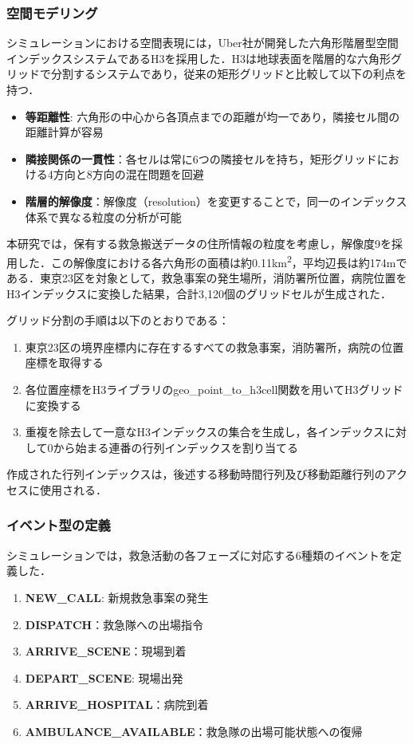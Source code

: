 \subsubsection{空間モデリング}
\label{空間モデリング}
シミュレーションにおける空間表現には，Uber社が開発した六角形階層型空間インデックスシステムであるH3\cite{H3}を採用した．H3は地球表面を階層的な六角形グリッドで分割するシステムであり，従来の矩形グリッドと比較して以下の利点を持つ．
\begin{itemize}
\item \textbf{等距離性}: 六角形の中心から各頂点までの距離が均一であり，隣接セル間の距離計算が容易
\item \textbf{隣接関係の一貫性}：各セルは常に6つの隣接セルを持ち，矩形グリッドにおける4方向と8方向の混在問題を回避
\item \textbf{階層的解像度}：解像度（resolution）を変更することで，同一のインデックス体系で異なる粒度の分析が可能
\end{itemize}
本研究では，保有する救急搬送データの住所情報の粒度を考慮し，解像度9を採用した．この解像度における各六角形の面積は約0.11\si{km^2}，平均辺長は約174mである．東京23区を対象として，救急事案の発生場所，消防署所位置，病院位置をH3インデックスに変換した結果，合計3,120個のグリッドセルが生成された．

グリッド分割の手順は以下のとおりである：
\begin{enumerate}
  \item 東京23区の境界座標内に存在するすべての救急事案，消防署所，病院の位置座標を取得する
  \item 各位置座標をH3ライブラリのgeo\_point\_to\_h3cell関数を用いてH3グリッドに変換する
  \item 重複を除去して一意なH3インデックスの集合を生成し，各インデックスに対して0から始まる連番の行列インデックスを割り当てる
\end{enumerate}
作成された行列インデックスは，後述する移動時間行列及び移動距離行列のアクセスに使用される．

\subsubsection{イベント型の定義}
シミュレーションでは，救急活動の各フェーズに対応する6種類のイベントを定義した．
\begin{enumerate}
\item \textbf{NEW\_CALL}: 新規救急事案の発生
\item \textbf{DISPATCH}：救急隊への出場指令
\item \textbf{ARRIVE\_SCENE}：現場到着
\item \textbf{DEPART\_SCENE}: 現場出発
\item \textbf{ARRIVE\_HOSPITAL}：病院到着
\item \textbf{AMBULANCE\_AVAILABLE}：救急隊の出場可能状態への復帰
\end{enumerate}

